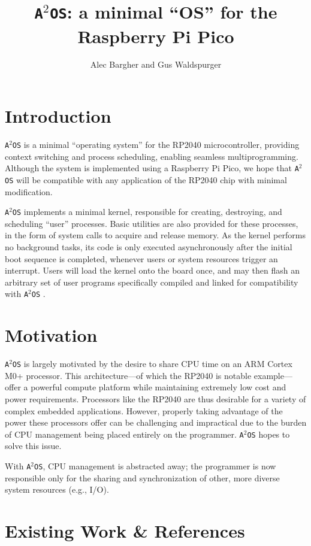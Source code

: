\documentclass[12pt]{article}
\title{\texttt{A$^2$OS}: a minimal ``OS'' for the Raspberry Pi Pico}
\author{Alec Bargher and Gus Waldspurger}
\date{}
\newcommand{\os}{\texttt{A$^2$OS} }
\newcommand{\osns}{\texttt{A$^2$OS}}
\begin{document}
\maketitle

\section{Introduction}
\os is a minimal ``operating system'' for the RP2040 microcontroller, providing
context switching and process scheduling, enabling seamless multiprogramming.
Although the system is implemented using a Raspberry Pi Pico, we hope that \os
will be compatible with any application of the RP2040 chip with minimal
modification.

\vspace{.5em}

\os implements a minimal kernel, responsible for creating, destroying, and
scheduling ``user'' processes. Basic utilities are also provided for these
processes, in the form of system calls to acquire and release memory. As the
kernel performs no background tasks, its code is only executed asynchronously
after the initial boot sequence is completed, whenever users or system resources
trigger an interrupt. Users will load the kernel onto the board once, and may
then flash an arbitrary set of user programs specifically compiled and linked
for compatibility with \os.

\section{Motivation}

\os is largely motivated by the desire to share CPU time on an ARM Cortex M0+
processor. This architecture---of which the RP2040 is notable example---offer a
powerful compute platform while maintaining extremely low cost and power
requirements. Processors like the RP2040 are thus desirable for a variety of
complex embedded applications. However, properly taking advantage of the
power these processors offer can be challenging and impractical due to the
burden of CPU management being placed entirely on the programmer. \os hopes to
solve this issue.

With \osns, CPU management is abstracted away; the programmer is now responsible
only for the sharing and synchronization of other, more diverse system
resources (e.g., I/O).

\section{Existing Work \& References}
\end{document}
